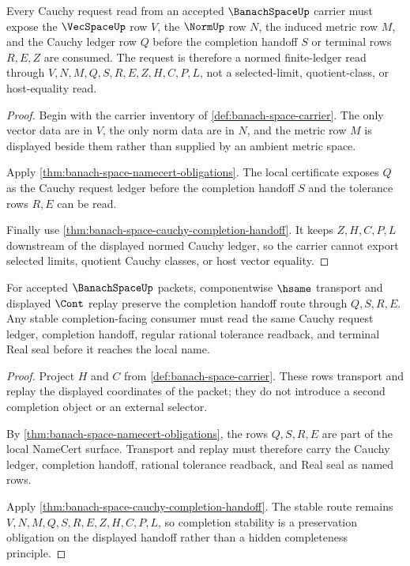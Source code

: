 \begin{theorem}
\label{thm:banach-space-normed-cauchy-ledger}
Every Cauchy request read from an accepted $\BanachSpaceUp$ carrier must expose the $\VecSpaceUp$ row $V$, the $\NormUp$ row $N$, the induced metric row $M$, and the Cauchy ledger row $Q$ before the completion handoff $S$ or terminal rows $R,E,Z$ are consumed. The request is therefore a normed finite-ledger read through $V,N,M,Q,S,R,E,Z,H,C,P,L$, not a selected-limit, quotient-class, or host-equality read.
\end{theorem}
\begin{proof}
Begin with the carrier inventory of \autoref{def:banach-space-carrier}. The only vector data are in $V$, the only norm data are in $N$, and the metric row $M$ is displayed beside them rather than supplied by an ambient metric space.

Apply \autoref{thm:banach-space-namecert-obligations}. The local certificate exposes $Q$ as the Cauchy request ledger before the completion handoff $S$ and the tolerance rows $R,E$ can be read.

Finally use \autoref{thm:banach-space-cauchy-completion-handoff}. It keeps $Z,H,C,P,L$ downstream of the displayed normed Cauchy ledger, so the carrier cannot export selected limits, quotient Cauchy classes, or host vector equality.
\end{proof}

\begin{theorem}
\label{thm:banach-space-completion-stability-obligation}
For accepted $\BanachSpaceUp$ packets, componentwise $\hsame$ transport and displayed $\Cont$ replay preserve the completion handoff route through $Q,S,R,E$. Any stable completion-facing consumer must read the same Cauchy request ledger, completion handoff, regular rational tolerance readback, and terminal Real seal before it reaches the local name.
\end{theorem}
\begin{proof}
Project $H$ and $C$ from \autoref{def:banach-space-carrier}. These rows transport and replay the displayed coordinates of the packet; they do not introduce a second completion object or an external selector.

By \autoref{thm:banach-space-namecert-obligations}, the rows $Q,S,R,E$ are part of the local NameCert surface. Transport and replay must therefore carry the Cauchy ledger, completion handoff, rational tolerance readback, and Real seal as named rows.

Apply \autoref{thm:banach-space-cauchy-completion-handoff}. The stable route remains $V,N,M,Q,S,R,E,Z,H,C,P,L$, so completion stability is a preservation obligation on the displayed handoff rather than a hidden completeness principle.
\end{proof}

